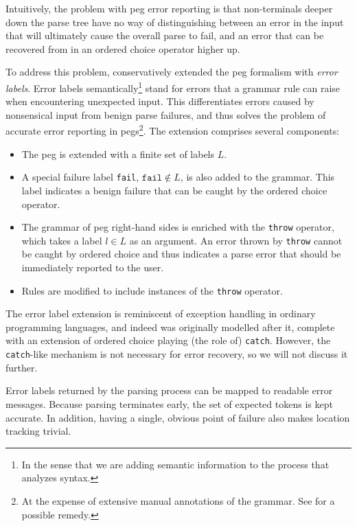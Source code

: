 Intuitively, the problem with \acrshort{peg} error reporting is that
non-terminals deeper down the parse tree have no way of distinguishing between
an error in the input that will ultimately cause the overall parse to fail, and
an error that can be recovered from in an ordered choice operator higher up.

To address this problem,  conservatively
extended the \acrshort{peg} formalism with \emph{error
labels}\cite{maidl2013exception}. Error labels semantically\footnote{In the
sense that we are adding semantic information to the process that analyzes
syntax.} stand for errors that a grammar rule can raise when encountering
unexpected input. This differentiates errors caused by nonsensical input from
benign parse failures, and thus solves the problem of accurate error reporting
in \acrlong{peg}s\footnote{At the expense of extensive manual annotations of the
grammar. See \cite{demedeiros2020automatic} for a possible remedy.}. The
extension comprises several components:

\begin{itemize}
	\item The \acrlong{peg} is extended with a finite set of labels $L$.
	\item A special failure label \texttt{fail}, $\texttt{fail} \not \in L$, is
	also added to the grammar. This label indicates a benign failure that can be
	caught by the ordered choice operator.
	\item The grammar of \acrlong{peg} right-hand sides is enriched with the
	\texttt{throw} operator, which takes a label $l \in L$ as an argument. An
	error thrown by \texttt{throw} cannot be caught by ordered choice and thus
	indicates a parse error that should be immediately reported to the user.
	\item Rules are modified to include instances of the \texttt{throw}
	operator.
\end{itemize}

The error label extension is reminiscent of exception handling in ordinary
programming languages, and indeed was originally modelled after it, complete
with an extension of ordered choice playing (the role of)
\texttt{catch}\cite{demedeiros2016parsing}. However, the \texttt{catch}-like
mechanism is not necessary for error recovery, so we will not discuss it
further.

Error labels returned by the parsing process can be mapped to readable error
messages. Because parsing terminates early, the set of expected tokens is kept
accurate. In addition, having a single, obvious point of failure also makes
location tracking trivial.

